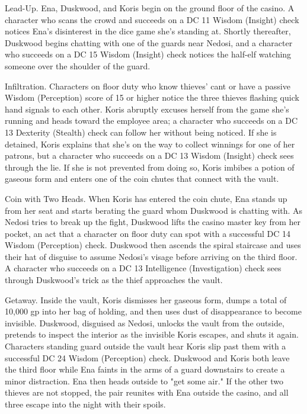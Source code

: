 \documentclass[10pt,a4paper,twoside,twocolumn,openany,nodeprecatedcode]{dndbook}
\begin{document}
\begin{description}[nolistsep]
\item[Stage 1:]
Lead-Up. Ena, Duskwood, and Koris begin on the ground floor of the casino. A character who scans the crowd and succeeds on a DC 11 Wisdom (Insight) check notices Ena's disinterest in the dice game she's standing at. Shortly thereafter, Duskwood begins chatting with one of the guards near Nedosi, and a character who succeeds on a DC 15 Wisdom (Insight) check notices the half-elf watching someone over the shoulder of the guard.
\item[Stage 2:]
Infiltration. Characters on floor duty who know thieves' cant or have a passive Wisdom (Perception) score of 15 or higher notice the three thieves flashing quick hand signals to each other. Koris abruptly excuses herself from the game she's running and heads toward the employee area; a character who succeeds on a DC 13 Dexterity (Stealth) check can follow her without being noticed. If she is detained, Koris explains that she's on the way to collect winnings for one of her patrons, but a character who succeeds on a DC 13 Wisdom (Insight) check sees through the lie. If she is not prevented from doing so, Koris imbibes a potion of gaseous form and enters one of the coin chutes that connect with the vault.
\item[Stage 3:]
Coin with Two Heads. When Koris has entered the coin chute, Ena stands up from her seat and starts berating the guard whom Duskwood is chatting with. As Nedosi tries to break up the fight, Duskwood lifts the casino master key from her pocket, an act that a character on floor duty can spot with a successful DC 14 Wisdom (Perception) check. Duskwood then ascends the spiral staircase and uses their hat of disguise to assume Nedosi's visage before arriving on the third floor. A character who succeeds on a DC 13 Intelligence (Investigation) check sees through Duskwood's trick as the thief approaches the vault.

\item[Stage 4:]
Getaway. Inside the vault, Koris dismisses her gaseous form, dumps a total of 10,000 gp into her bag of holding, and then uses dust of disappearance to become invisible. Duskwood, disguised as Nedosi, unlocks the vault from the outside, pretends to inspect the interior as the invisible Koris escapes, and shuts it again. Characters standing guard outside the vault hear Koris slip past them with a successful DC 24 Wisdom (Perception) check. Duskwood and Koris both leave the third floor while Ena faints in the arms of a guard downstairs to create a minor distraction. Ena then heads outside to "get some air." If the other two thieves are not stopped, the pair reunites with Ena outside the casino, and all three escape into the night with their spoils.
\end{description}
\end{document}
